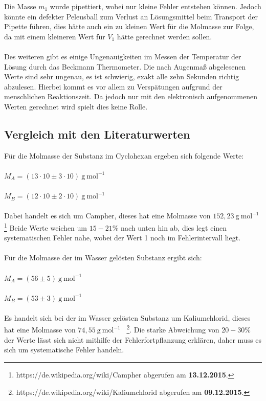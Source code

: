 \documentclass[12pt,a4paper,titlepage,headinclude,bibtotoc]{scrartcl}
\begin{document}
Die Masse $m_1$ wurde pipettiert, wobei nur kleine Fehler entstehen können. Jedoch könnte ein defekter Peleusball zum Verlust an Lösungsmittel beim Transport der Pipette führen, dies hätte auch ein zu kleinen Wert für die Molmasse zur Folge, da mit einem kleineren Wert für $V_1$ hätte gerechnet werden sollen. \\\\  
Des weiteren gibt es einige Ungenauigkeiten im Messen der Temperatur der Lösung durch das Beckmann Thermometer. Die nach Augenmaß abgelesenen Werte sind sehr ungenau, es ist schwierig, exakt alle zehn Sekunden richtig abzulesen. Hierbei kommt es vor allem zu Verspätungen aufgrund der menschlichen Reaktionszeit. Da jedoch nur mit den elektronisch aufgenommenen Werten gerechnet wird spielt dies keine Rolle.

\subsection{Vergleich mit den Literaturwerten}
Für die Molmasse der Substanz im Cyclohexan ergeben sich folgende Werte:\\\\
$M_A = (13 \cdot 10 \pm 3 \cdot 10){~} \mathrm{g{~}mol^{-1}}$\\\\
$M_B = (12 \cdot 10 \pm 2 \cdot 10){~} \mathrm{g{~}mol^{-1}}$\\\\
Dabei handelt es sich um Campher, dieses hat eine Molmasse von $ 152,23{~} \mathrm{g{~}mol^{-1}}$ \footnote{https://de.wikipedia.org/wiki/Campher abgerufen am \textbf{13.12.2015}.} Beide Werte weichen um $15-21\%$ nach unten hin ab, dies legt einen systematischen Fehler nahe, wobei der Wert 1 noch im Fehlerintervall liegt.\\\\
Für die Molmasse der im Wasser gelösten Substanz ergibt sich:\\\\
$M_A = (56 \pm 5){~} \mathrm{g{~}mol^{-1}}$\\\\
$M_B = (53 \pm 3){~} \mathrm{g{~}mol^{-1}}$\\\\
Es handelt sich bei der im Wasser gelösten Substanz um Kaliumchlorid, dieses hat eine Molmasse von $74,55{~} \mathrm{g{~}mol^{-1}}$ {~}\footnote{https://de.wikipedia.org/wiki/Kaliumchlorid abgerufen am \textbf{09.12.2015}.}. Die starke Abweichung von $20-30\%$ der Werte lässt sich nicht mithilfe der Fehlerfortpflanzung erklären, daher muss es sich um systematische Fehler handeln. 
\end{document}
